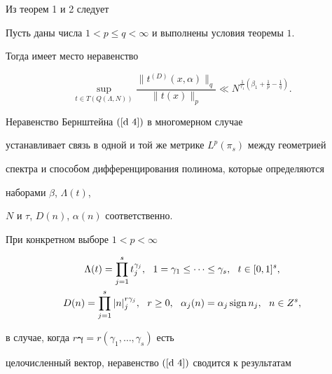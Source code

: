 Из теорем 1 и 2 следует





\begin{thm} 


Пусть даны числа $1<p\leq q<\infty$ и выполнены условия теоремы $1$.


Тогда имеет место неравенство 


$$


\sup_{t\in T(Q(\Lambda,N))}\frac{\|t^{(D)}(x,\alpha)


\|_q}{\| t(x)\|_p} \ll


N^{\frac{1}{\tau_1}(\beta_1+\frac{1}{p}-\frac{1}{q})}.


$$


\end{thm}





\begin{note}


Неравенство Бернштейна $(\ref{d 4})$ в многомерном случае


устанавливает связь в одной и той же метрике $L^p(\pi_s)$ между геометрией


спектра и способом дифференцирования полинома, которые определяются


наборами $\beta$, $\Lambda(t)$,


$N$ и $\tau$, $D(n)$, $\alpha(n)$ соответственно.


\end{note}





При конкретном выборе $1<p<\infty$


\begin{gather} \label{d 8}


\Lambda(t)=\prod_{j=1}^s t_j^{\gamma_j}, \ \ 1=\gamma_1 \leq \dotsb


\leq \gamma_s, \ \ t\in [0,1]^s, \\


%


D(n)=\prod_{j=1}^s |n|_j^{r\gamma_j},\ \ r\geq 0,\ \ {\alpha}_{j}


(n)= {{\alpha}_j} \sign {n_j},\ \ n\in Z^s,\notag


\end{gather}


в случае, когда $r{\boldsymbol{\gamma}}=r(\gamma_1,\dotsc,\gamma_s)$ есть 


целочисленный вектор, неравенство $(\ref {d 4})$ сводится к результатам 


